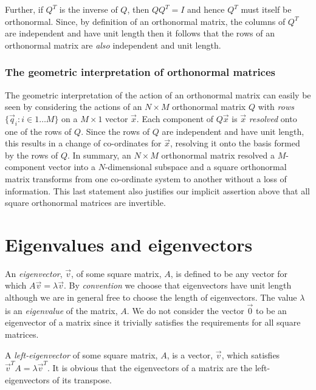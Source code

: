 \documentclass[a4paper]{article}
\newcommand{\highlight}[1]{{\color{blue}#1}}
\begin{document}
Further, if $Q^T$ is the inverse of $Q$, then $QQ^T = I$ and hence $Q^T$ must
itself be orthonormal. Since, by definition of an orthonormal matrix, the columns
of $Q^T$ are independent and have unit length then it follows that
\highlight{the rows of an orthonormal matrix are \emph{also} independent and
unit length}.

\subsubsection{The geometric interpretation of orthonormal matrices}

The geometric interpretation of the action of an orthonormal matrix can easily
be seen by considering the actions of an $N \times M$ orthonormal matrix $Q$
with \emph{rows} $\{ \vec{q}_i : i \in 1 \dots M \}$ on a $M \times 1$ vector
$\vec{x}$. Each component of $Q\vec{x}$ is $\vec{x}$ \emph{resolved} onto one of
the rows of $Q$. Since the rows of $Q$ are independent and have unit length,
this results in a change of co-ordinates for $\vec{x}$, resolving it onto the
basis formed by the rows of $Q$.  In summary, \highlight{an $N \times M$
orthonormal matrix resolved a $M$-component vector into a $N$-dimensional
subspace} and \highlight{a square orthonormal matrix transforms from one
co-ordinate system to another without a loss of information}. This last
statement also justifies our implicit assertion above that all square
orthonormal matrices are invertible.

\section{Eigenvalues and eigenvectors}

An \emph{eigenvector}, $\vec{v}$, of some \highlight{square matrix}, $A$, is
defined to be any vector for which \highlight{$A \vec{v} = \lambda \vec{v}$}. By
\emph{convention} we choose that \highlight{eigenvectors have unit length}
although we are in general free to choose the length of eigenvectors. The value
$\lambda$ is an \emph{eigenvalue} of the matrix, $A$.  \highlight{We do not
consider the vector $\vec{0}$ to be an eigenvector} of a matrix since it
trivially satisfies the requirements for all square matrices.

A \emph{left-eigenvector} of some square matrix, $A$, is a vector, $\vec{v}$,
which satisfies \highlight{$\vec{v}^T A = \lambda \vec{v}^T$}. It is obvious
that \highlight{the eigenvectors of a matrix are the left-eigenvectors of its
transpose}.
\end{document}
